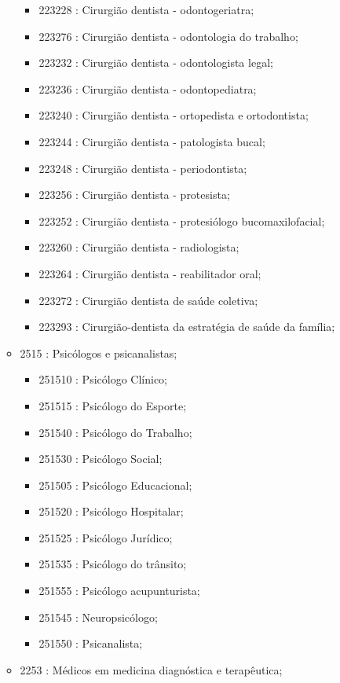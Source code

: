 \begin{itemize}
\begin{itemize}
\begin{itemize}
      \item 223228 : Cirurgião dentista - odontogeriatra;
      \item 223276 : Cirurgião dentista - odontologia do trabalho;
      \item 223232 : Cirurgião dentista - odontologista legal;
      \item 223236 : Cirurgião dentista - odontopediatra;
      \item 223240 : Cirurgião dentista - ortopedista e ortodontista;
      \item 223244 : Cirurgião dentista - patologista bucal;
      \item 223248 : Cirurgião dentista - periodontista;
      \item 223256 : Cirurgião dentista - protesista;
      \item 223252 : Cirurgião dentista - protesiólogo bucomaxilofacial;
      \item 223260 : Cirurgião dentista - radiologista;
      \item 223264 : Cirurgião dentista - reabilitador oral;
      \item 223272 : Cirurgião dentista de saúde coletiva;
      \item 223293 : Cirurgião-dentista da estratégia de saúde da família;
    \end{itemize}
    \item 2515 : Psicólogos e psicanalistas;
    \begin{itemize}
      \item 251510 : Psicólogo Clínico;
      \item 251515 : Psicólogo do Esporte;
      \item 251540 : Psicólogo do Trabalho;
      \item 251530 : Psicólogo Social;
      \item 251505 : Psicólogo Educacional;
      \item 251520 : Psicólogo Hospitalar;
      \item 251525 : Psicólogo Jurídico;
      \item 251535 : Psicólogo do trânsito;
      \item 251555 : Psicólogo acupunturista;
      \item 251545 : Neuropsicólogo;
      \item 251550 : Psicanalista;
    \end{itemize}
    \item 2253 : Médicos em medicina diagnóstica e terapêutica;
    \begin{itemize}

\end{itemize}
\end{itemize}
\end{itemize}
